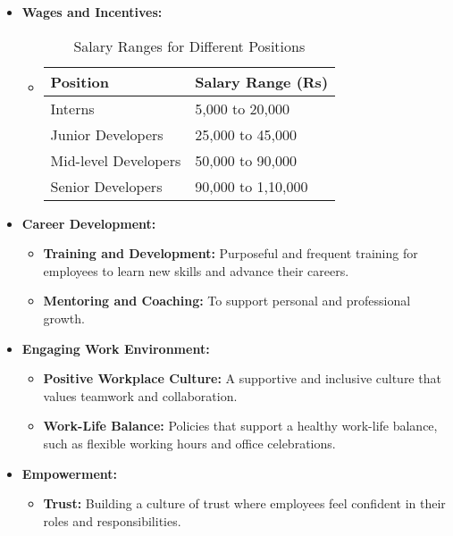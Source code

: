 \begin{itemize}
\item \textbf{Wages and Incentives:}
\begin{itemize}
    \item[]
          \begin{table}[h!]
              \centering
              \begin{tabular}{| m{4cm} | m{5cm} |}
                  \hline
                  \textbf{Position}    & \textbf{Salary Range (Rs)} \\
                  \hline
                  Interns              & 5,000 to 20,000            \\
                  \hline
                  Junior Developers    & 25,000 to 45,000           \\
                  \hline
                  Mid-level Developers & 50,000 to 90,000           \\
                  \hline
                  Senior Developers    & 90,000 to 1,10,000         \\
                  \hline
              \end{tabular}
              \caption{Salary Ranges for Different Positions}
              \label{fig:salary_ranges}
          \end{table}
\end{itemize}

\item \textbf{Career Development:}
\begin{itemize}
    \item \textbf{Training and Development:} Purposeful and frequent training for employees to learn new skills and advance their careers.
    \item \textbf{Mentoring and Coaching:} To support personal and professional growth.
\end{itemize}

\item \textbf{Engaging Work Environment:}
\begin{itemize}
    \item \textbf{Positive Workplace Culture:} A supportive and inclusive culture that values teamwork and collaboration.
    \item \textbf{Work-Life Balance:} Policies that support a healthy work-life balance, such as flexible working hours and office celebrations.
\end{itemize}

\item \textbf{Empowerment:}
\begin{itemize}
    \item \textbf{Trust:} Building a culture of trust where employees feel confident in their roles and responsibilities.
\end{itemize}


\end{itemize}
